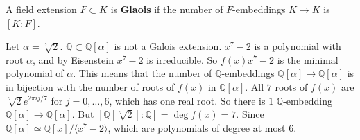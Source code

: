   \begin{definition}[Galois]
    A field extension $F \subset K$ is \textbf{Glaois} if the number of $F$-embeddings $K \to K$ is $[K:F]$. 
  \end{definition}

  \begin{example}
    Let $\alpha = \sqrt[7]{2}$. $\mathbb{Q} \subset \mathbb{Q}[\alpha]$ is not a Galois extension. $x^7 - 2$ is a polynomial with root $\alpha$, and by Eisenstein $x^7 - 2$ is irreducible. So $f(x) x^7 - 2$ is the minimal polynomial of $\alpha$. This means that the number of $\mathbb{Q}$-embeddings $\mathbb{Q}[\alpha] \to \mathbb{Q}[\alpha]$ is in bijection with the number of roots of $f(x)$ in $\mathbb{Q}[\alpha]$. All $7$ roots of $f(x)$ are $\sqrt[7]{2} e^{2\pi i j/7}$ for $j = 0, \ldots, 6$, which has one real root. So there is $1$ $\mathbb{Q}$-embedding $\mathbb{Q}[\alpha] \to \mathbb{Q}[\alpha]$. But $[\mathbb{Q}[\sqrt[7]{2}] : \mathbb{Q}] = \deg{f(x)} = 7$. Since $\mathbb{Q}[\alpha] \simeq \mathbb{Q}[x]/{\langle x^7 - 2 \rangle}$, which are polynomials of degree at most $6$. 
  \end{example}

